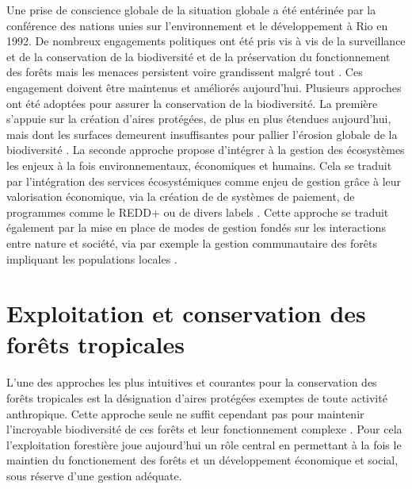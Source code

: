 \documentclass[
  11pt,
  french,
  A4paper,
  extrafontsizes,onecolumn,openright
  ]{memoir}
\begin{document}
Une prise de conscience globale de la situation globale a été entérinée
par la conférence des nations unies sur l'environnement et le
développement à Rio en 1992. De nombreux engagements politiques ont été
pris vis à vis de la surveillance et de la conservation de la
biodiversité et de la préservation du fonctionnement des forêts mais les
menaces persistent voire grandissent malgré tout
\autocites{Summit1992}{Schlaepfer2000}{Dirzo2003a}{Morales-Hidalgo2015}.
Ces engagement doivent être maintenus et améliorés aujourd'hui.
Plusieurs approches ont été adoptées pour assurer la conservation de la
biodiversité. La première s'appuie sur la création d'aires protégées, de
plus en plus étendues aujourd'hui, mais dont les surfaces demeurent
insuffisantes pour pallier l'érosion globale de la biodiversité
\autocite{Sist2015}. La seconde approche propose d'intégrer à la gestion
des écosystèmes les enjeux à la fois environnementaux, économiques et
humains. Cela se traduit par l'intégration des services écosystémiques
comme enjeu de gestion grâce à leur valorisation économique, via la
création de de systèmes de paiement, de programmes comme le REDD+ ou de
divers labels \autocites{Agrawal2011}{Barlow2018}. Cette approche se
traduit également par la mise en place de modes de gestion fondés sur
les interactions entre nature et société, via par exemple la gestion
communautaire des forêts impliquant les populations locales
\autocite{Liu2015}.

\section{Exploitation et conservation des forêts
tropicales}\label{exploitation-et-conservation-des-forets-tropicales}

L'une des approches les plus intuitives et courantes pour la
conservation des forêts tropicales est la désignation d'aires protégées
exemptes de toute activité anthropique. Cette approche seule ne suffit
cependant pas pour maintenir l'incroyable biodiversité de ces forêts et
leur fonctionnement complexe \autocite{Sist2015}. Pour cela
l'exploitation forestière joue aujourd'hui un rôle central en permettant
à la fois le maintien du fonctionement des forêts et un développement
économique et social, sous réserve d'une gestion adéquate.
\end{document}
